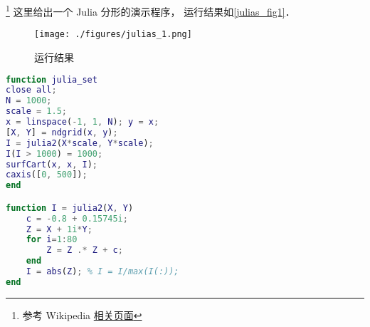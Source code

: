 
\footnote{参考 Wikipedia \href{https://en.wikipedia.org/wiki/Julia_set#Quadratic_polynomials}{相关页面}} 这里给出一个 Julia 分形的演示程序， 运行结果如\autoref{julias_fig1}．

\begin{figure}[ht]
\centering
\texttt{[image: ./figures/julias\_1.png]}
\caption{运行结果} \label{julias_fig1}
\end{figure}

\begin{lstlisting}[language=matlab]
function julia_set
close all;
N = 1000;
scale = 1.5;
x = linspace(-1, 1, N); y = x;
[X, Y] = ndgrid(x, y);
I = julia2(X*scale, Y*scale);
I(I > 1000) = 1000;
surfCart(x, x, I);
caxis([0, 500]);
end

function I = julia2(X, Y)
    c = -0.8 + 0.15745i;
    Z = X + 1i*Y;
    for i=1:80
        Z = Z .* Z + c;
    end
    I = abs(Z); % I = I/max(I(:));
end
\end{lstlisting}
